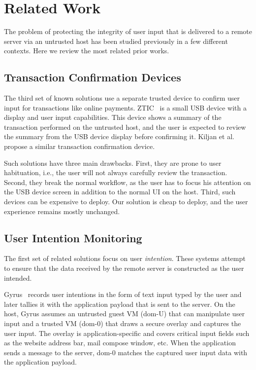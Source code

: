 \section{Related Work}
\label{sec:relatedWork_IK}

The problem of protecting the integrity of user input that is delivered to a remote server via an untrusted host has been studied previously in a few different contexts. Here we review the most related prior works.

\subsection{Transaction Confirmation Devices} 

The third set of known solutions use a separate trusted device to confirm user input for transactions like online payments. ZTIC~\cite{weigold2011} is a small USB device with a display and user input capabilities. This device shows a summary of the transaction performed on the untrusted host, and the user is expected to review the summary from the USB device display before confirming it. Kiljan et al.~\cite{6978928} propose a similar transaction confirmation device. 

Such solutions have three main drawbacks. First, they are prone to user habituation, i.e., the user will not always carefully review the transaction. Second, they break the normal workflow, as the user has to focus his attention on the USB device screen in addition to the normal UI on the host. Third, such devices can be expensive to deploy. Our solution is cheap to deploy, and the user experience remains mostly unchanged. 



\subsection{User Intention Monitoring} 

The first set of related solutions focus on user \emph{intention}. These systems attempt to ensure that the data received by the remote server is constructed as the user intended. 

Gyrus~\cite{gyrus} records user intentions in the form of text input typed by the user and later tallies it with the application payload that is sent to the server. On the host, Gyrus assumes an untrusted guest VM (dom-U) that can manipulate user input and a trusted VM (dom-0) that draws a secure overlay and captures the user input. The overlay is application-specific and covers critical input fields such as the website address bar, mail compose window, etc. When the application sends a message to the server, dom-0 matches the captured user input data with the application payload. 

